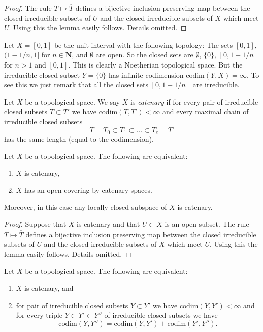 \begin{proof}
The rule $T \mapsto \overline{T}$ defines a bijective
inclusion preserving map between the closed irreducible subsets
of $U$ and the closed irreducible subsets of $X$ which meet $U$.
Using this the lemma easily follows. Details omitted.
\end{proof}

\begin{example}
\label{example-Noetherian-infinite-codimension}
Let $X = [0, 1]$ be the unit interval with the following
topology: The sets $[0, 1]$, $(1 - 1/n, 1]$ for $n \in \mathbf{N}$, and
$\emptyset$ are open. So the closed sets are
$\emptyset$, $\{0\}$, $[0, 1 - 1/n]$ for $n > 1$ and $[0, 1]$.
This is clearly a Noetherian topological space.
But the irreducible closed subset $Y = \{0\}$ has infinite
codimension $\text{codim}(Y, X) = \infty$.
To see this we just remark that all the closed sets
$[0, 1 - 1/n]$ are irreducible.
\end{example}

\begin{definition}
\label{definition-catenary}
Let $X$ be a topological space. We say $X$ is {\it catenary} if
for every pair of irreducible closed subsets $T \subset T'$
we have $\text{codim}(T, T') < \infty$ and every maximal chain
of irreducible closed subsets
$$
T = T_0 \subset T_1 \subset \ldots \subset T_e = T'
$$
has the same length (equal to the codimension).
\end{definition}

\begin{lemma}
\label{lemma-catenary}
Let $X$ be a topological space.
The following are equivalent:
\begin{enumerate}
\item $X$ is catenary,
\item $X$ has an open covering by catenary spaces.
\end{enumerate}
Moreover, in this case any locally closed subspace of $X$ is catenary.
\end{lemma}

\begin{proof}
Suppose that $X$ is catenary and that $U \subset X$ is an open
subset. The rule $T \mapsto \overline{T}$ defines a bijective
inclusion preserving map between the closed irreducible subsets
of $U$ and the closed irreducible subsets of $X$ which meet $U$.
Using this the lemma easily follows. Details omitted.
\end{proof}

\begin{lemma}
\label{lemma-catenary-in-codimension}
Let $X$ be a topological space. The following are equivalent:
\begin{enumerate}
\item $X$ is catenary, and
\item for pair of irreducible closed subsets $Y \subset Y'$ we have
$\text{codim}(Y, Y') < \infty$ and for every triple
$Y \subset Y' \subset Y''$ of irreducible closed subsets we have
$$
\text{codim}(Y, Y'') = \text{codim}(Y, Y') + \text{codim}(Y', Y'').
$$
\end{enumerate}
\end{lemma}

